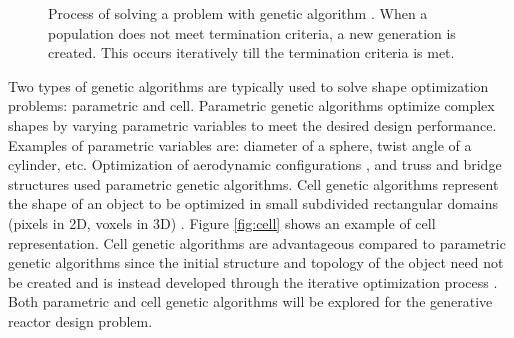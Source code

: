 \documentclass[letterpaper,11pt]{article}
\begin{document}
\begin{figure}[]
        \centering
        \caption{Process of solving a problem with genetic algorithm 
        \cite{renner_genetic_2003}. When a population does not meet termination 
        criteria, a new generation is created. This occurs iteratively till the 
        termination criteria is met. }
        \label{fig:genetic_alg}
\end{figure}

Two types of genetic algorithms are typically used to solve shape 
optimization problems: parametric and cell. 
Parametric genetic algorithms optimize complex shapes by varying parametric variables
to meet the desired design performance.
Examples of parametric variables are: diameter of a sphere, twist angle of a cylinder, 
etc.  
Optimization of aerodynamic configurations \cite{makinen_multidisciplinary_1999}, 
and truss and bridge structures \cite{raich_evolving_2000} used parametric 
genetic algorithms.
Cell genetic algorithms represent the shape of an object to be optimized in 
small subdivided rectangular domains (pixels in 2D, voxels in 3D) 
\cite{renner_genetic_2003}. 
Figure \ref{fig:cell} shows an example of cell representation. 
Cell genetic algorithms are advantageous compared to parametric genetic 
algorithms since the initial structure and topology of the object need not 
be created and is instead developed through the iterative optimization 
process \cite{renner_genetic_2003}. 
Both parametric and cell genetic algorithms will be explored for the generative 
reactor design problem. 
\end{document}
